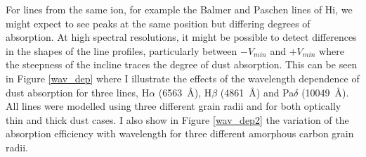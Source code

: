 For lines from the same ion, for example the Balmer and Paschen lines of 
H{\sc i}, we might expect to see peaks at the same position but differing 
degrees of absorption. At high spectral resolutions, it might be possible 
to detect differences in the shapes of the line profiles, particularly 
between $-V_{min}$ and $+V_{min}$ where the steepness of the incline 
traces the degree of dust absorption.  This can be seen in Figure 
\ref{wav_dep} where I illustrate the effects of the wavelength dependence 
of dust absorption for three lines, H$\alpha$ (6563~\AA), H$\beta$ 
(4861~\AA) and Pa$\delta$ (10049~\AA).  All lines were modelled using three 
different grain radii and for both optically thin and thick dust cases.  
I also show in Figure \ref{wav_dep2} the variation of the absorption efficiency with wavelength 
for three different amorphous carbon grain radii.
%
%
